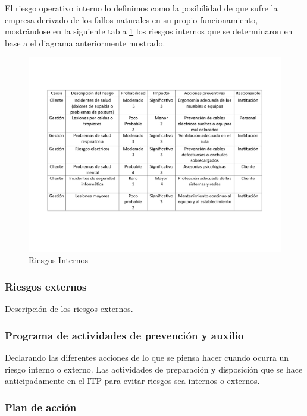     El riesgo operativo interno lo definimos como la posibilidad de que sufre la empresa derivado de los fallos naturales en su propio funcionamiento, mostrándose en la siguiente tabla \ref{fig:riesgosInternos} los riesgos internos que se determinaron en base a el diagrama anteriormente mostrado.
    \begin{figure}[H]
        \centering
        \includegraphics[scale=0.3]{21/img/tablaRiesgosInternos.pdf}
        \caption{Riesgos Internos}
        \label{fig:riesgosInternos}
    \end{figure}
    
    
    
    \subsubsection{Riesgos externos}
    
    Descripción de los riesgos externos.
    \subsubsection{Programa de actividades de prevención y auxilio}
    
    Declarando las diferentes acciones de lo que se piensa hacer cuando ocurra un riesgo interno o externo. 
    Las actividades de preparación y disposición que se hace anticipadamente en el ITP para evitar riesgos sea internos o externos.
    \subsubsection{Plan de acción}
    
